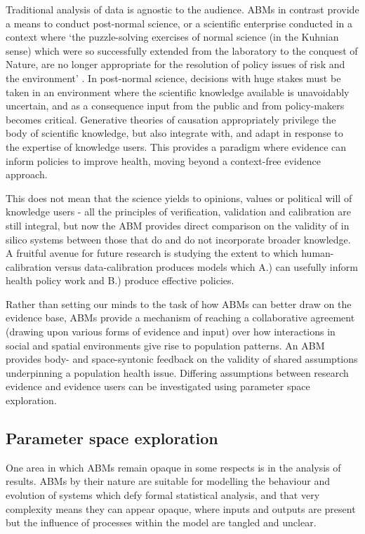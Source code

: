 \documentclass[review]{elsarticle}
\begin{document}
Traditional analysis of data is agnostic to the audience. ABMs in contrast provide a means to conduct post-normal science, or a scientific enterprise conducted in a context where `the puzzle-solving exercises of normal science (in the Kuhnian sense) which were so successfully extended from the laboratory to the conquest of Nature, are no longer appropriate for the resolution of policy issues of risk and the environment' \citep[][p. 750]{funtowicz1993}.  In post-normal science, decisions with huge stakes must be taken in an environment where the scientific knowledge available is unavoidably uncertain, and as a consequence input from the public and from policy-makers becomes critical. Generative theories of causation appropriately privilege the body of scientific knowledge, but also integrate with, and adapt in response to the expertise of knowledge users. This provides a paradigm where evidence can inform policies to improve health, moving beyond a context-free evidence approach. 

This does not mean that the science yields to opinions, values or political will of knowledge users - all the principles of verification, validation and calibration are still integral, but now the ABM provides direct comparison on the validity of in silico systems between those that do and do not incorporate broader knowledge. A fruitful avenue for future research is studying the extent to which human-calibration versus data-calibration produces models which A.) can usefully inform health policy work and B.) produce effective policies.

Rather than setting our minds to the task of how ABMs can better draw on the evidence base,  ABMs provide a mechanism of reaching a collaborative agreement (drawing upon various forms of evidence and input) over how interactions in social and spatial environments give rise to population patterns. An ABM provides body- and space-syntonic feedback on the validity of shared assumptions underpinning a population health issue. Differing assumptions between research evidence and evidence users can be investigated using parameter space exploration.

\subsection{Parameter space exploration}

One area in which ABMs remain opaque in some respects is in the analysis of results.  ABMs by their nature are suitable for modelling the behaviour and evolution of systems which defy formal statistical analysis, and that very complexity means they can appear opaque, where inputs and outputs are present but the influence of processes within the model are tangled and unclear.
\end{document}
